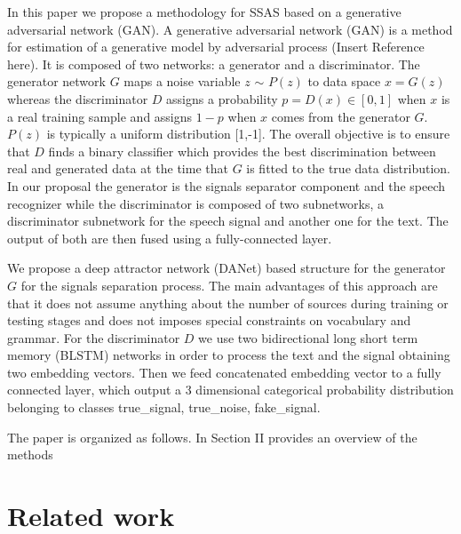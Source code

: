 \documentclass{article}
\begin{document}
In this paper we propose a methodology for SSAS based on a generative adversarial network (GAN). 
A generative adversarial network (GAN) is a method for estimation of a generative model by adversarial process (Insert Reference here). It is composed of two networks: a generator and a discriminator. The generator network $G$ maps a noise variable $z$ $\mathtt{\sim}$ $P(z)$ to data space $x=G(z)$ whereas the discriminator $D$ assigns a probability $p=D(x) \in [0,1]$ when $x$ is a real training sample and assigns $1-p$ when $x$  comes from the generator $G$.  $P(z)$ is typically a uniform distribution [1,-1]. 
The overall objective is to ensure that $D$ finds a binary classifier which provides the best  discrimination between real and generated data at the time that $G$ is fitted to the true data distribution. 
In our proposal the generator is the signals separator component and the speech recognizer while the discriminator is composed of two subnetworks, a discriminator subnetwork for the speech signal and another one for the text. The output of both are then fused using a fully-connected layer.

We propose a deep attractor network (DANet) based structure for the generator $G$ for the signals separation process. The main advantages of this approach are that it does not assume anything about the number of sources during training or testing stages and does not imposes special constraints on vocabulary and grammar. For the discriminator $D$ we use two bidirectional long short term memory  (BLSTM) networks in order to process the text and the signal obtaining two embedding vectors. Then we feed concatenated embedding vector to a fully connected layer, which output a 3 dimensional categorical probability distribution belonging to classes {true\_signal, true\_noise, fake\_signal}.

The paper is organized as follows. In Section II provides an overview of the methods





 

\label{sec:intro}


\section{Related work}
\label{sec:related}
\end{document}
